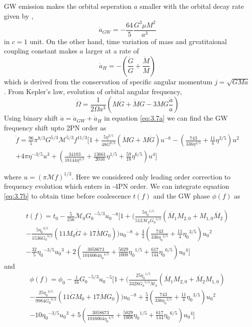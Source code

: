 \documentclass[11pt]{article}
\begin{document}
 \hspace*{15.5pt}GW emission makes the orbital seperation $a$ smaller with the orbital decay rate given by \cite{PhysRevD.49.2658},
 \begin{equation}
 \dot{a}_{GW}=-\frac{64}{5}\frac{G^3 \mu M^2}{a^3}
 \end{equation}
 in $c=1$ unit. On the other hand, time variation of mass and grvatitaional coupling constant makes $a$ larger at a rate of 
 \begin{equation}
 \dot{a}_H=-(\frac{\dot{G}}{G}+\frac{\dot{M}}{M})
 \end{equation}
 which is derived from the conservation of specific angular momentum $j=\sqrt{GMa}$. From Kepler's law, evolution of orbital angular frequency,
 \begin{equation}\label{eq:3.7a}
 \dot{\Omega}=\frac{1}{2\Omega a^3}(M\dot{G}+\dot{M}G-3MG\frac{\dot{a}}{a})
 \end{equation}
 \hspace*{15.5pt} Using binary shift $\dot{a}=\dot{a}_{GW}+\dot{a}_H$ in equation \eqref{eq:3.7a} we can find the GW frequency shift upto 2PN order as
 \begin{align} \label{eq:3.7b}
 \dot{f}=\frac{96}{5}\pi^{8/3}G^{5/3}\mathcal{M}^{5/3}f^{11/3}\bigg[1+\frac{5\eta^{3/5}}{48 G^{8/3}}(\dot{M}G+M\dot{G})u^{-8}-(\frac{743}{336\eta^{2/5}}+\frac{11}{4}\eta^{3/5})u^2\\+4\pi\eta^{-3/5}u^3+(\frac{34103}{18144\eta^{4/5}}+\frac{13661}{2016}\eta^{1/5}+\frac{59}{18}\eta^{6/5})u^4\bigg]
 \end{align}
 
where $u=(\pi \mathcal{M}f)^{1/3}$. Here we considered only leading order correction to frequency evolution which enters in -4PN order. We can integrate equation \eqref{eq:3.7b} to obtain time before coalescence $t(f)$ and the GW phase $\phi(f)$ as


\begin{align}
t(f)=t_0-\frac{5}{256}\mathcal{M}_0{G_0}^{-5/3}{u_0}^{-8}\bigg[1+\big(\frac{5{\eta_0}^{1/5}}{512\mathcal{M}_0{G_0}^{5/3}}(\dot{M_1}M_{2,0}+M_{1,0}\dot{M_{2}})\nonumber\\-\frac{5{\eta_0}^{3/5}}{1536{G_0}^{8/3}}(11M_0\dot{G}+17\dot{M}G_0)\big){u_0}^{-8}+\frac{4}{3}(\frac{743}{336{\eta_0}^{2/5}}+\frac{11}{4}{\eta_0}^{3/5}){u_0}^2\nonumber\\-\frac{32}{5}{\eta_0}^{-3/5}{u_0}^3+2(\frac{3058673}{1016064{\eta_0}^{4/5}}+\frac{5029}{1008}{\eta_0}^{1/5}+\frac{617}{144}{\eta_0}^{6/5}){u_0}^4\bigg]
\end{align}
and
\begin{align}
\phi(f)=\phi_0-\frac{1}{16}{G_0}^{-5/3}{u_0}^{-5}\bigg[1+\big(\frac{25{\eta_0}^{1/5}}{3328{G_0}^{5/3}{\mathcal{M}}_0}(\dot{M_1}M_{2,0}+\dot{M_2}M_{1,0})\nonumber\\-\frac{25{\eta_0}^{3/5}}{9984{G_0}^{8/3}}(11\dot{G}M_0+17\dot{M}G_0)\big){u_0}^{-8}+\frac{5}{3}(\frac{743}{336{\eta_0}^{2/5}}+\frac{11}{4}{\eta_0}^{3/5}){u_0}^2\nonumber\\-10{\eta_0}^{-3/5}{u_0}^3+5(\frac{3058673}{1016064{\eta_0}^{4/5}}+\frac{5029}{1008}{\eta_0}^{1/5}+\frac{617}{144}{\eta_0}^{6/5}){u_0}^4\bigg]
\end{align}
\end{document}
